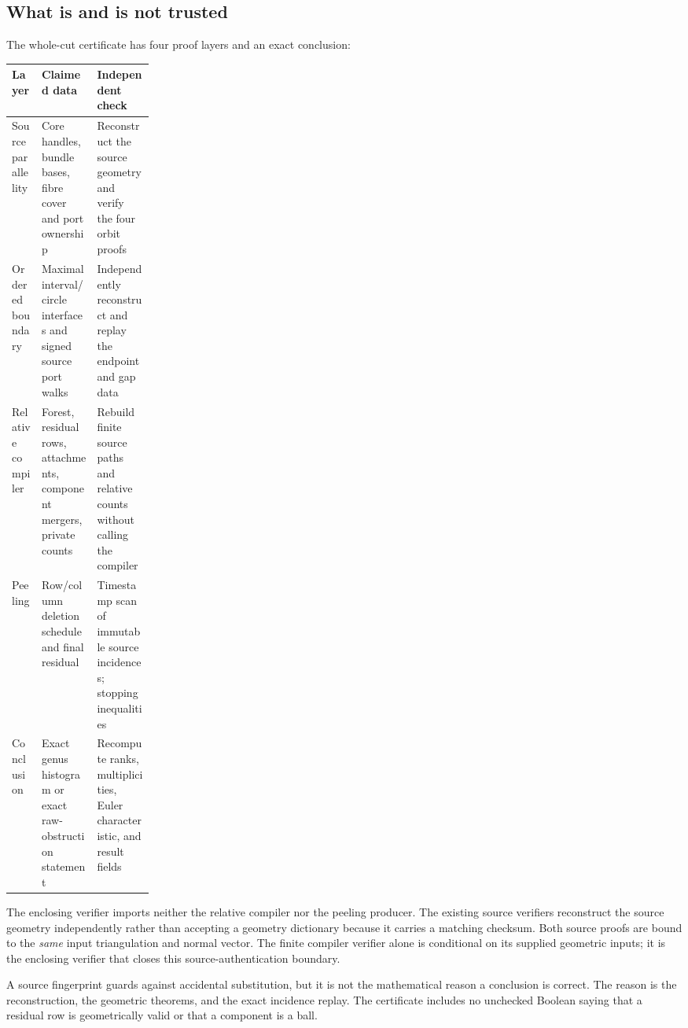 \subsection{What is and is not trusted}

The whole-cut certificate has four proof layers and an exact conclusion:
\begin{center}\small
\begin{tabularx}{\linewidth}{@{}p{0.21\linewidth}YY@{}}
\toprule
Layer & Claimed data & Independent check\\
\midrule
Source parallelity & Core handles, bundle bases, fibre cover and port
ownership & Reconstruct the source geometry and verify the four orbit proofs\\
Ordered boundary & Maximal interval/circle interfaces and signed source
port walks & Independently reconstruct and replay the endpoint and gap data\\
Relative compiler & Forest, residual rows, attachments, component mergers,
private counts & Rebuild finite source paths and relative counts without
calling the compiler\\
Peeling & Row/column deletion schedule and final residual & Timestamp scan
of immutable source incidences; stopping inequalities\\
Conclusion & Exact genus histogram or exact raw-obstruction statement &
Recompute ranks, multiplicities, Euler characteristic, and result fields\\
\bottomrule
\end{tabularx}
\end{center}

The enclosing verifier imports neither the relative compiler nor the
peeling producer.  The existing source verifiers reconstruct the source
geometry independently rather than accepting a geometry dictionary because
it carries a matching checksum.  Both source proofs are bound to the
\emph{same} input triangulation and normal vector.  The finite compiler
verifier alone is conditional on its supplied geometric inputs; it is the
enclosing verifier that closes this source-authentication boundary.

A source fingerprint guards against accidental substitution, but it is not
the mathematical reason a conclusion is correct.  The reason is the
reconstruction, the geometric theorems, and the exact incidence replay.
The certificate includes no unchecked Boolean saying that a residual row
is geometrically valid or that a component is a ball.


